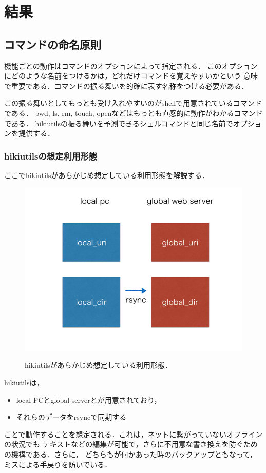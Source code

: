 
\section{結果}
\subsection{コマンドの命名原則}
機能ごとの動作はコマンドのオプションによって指定される．
このオプションにどのような名前をつけるかは，どれだけコマンドを覚えやすいかという
意味で重要である．コマンドの振る舞いを的確に表す名称をつける必要がある．

この振る舞いとしてもっとも受け入れやすいのがshellで用意されているコマンドである．
pwd, ls, rm, touch, openなどはもっとも直感的に動作がわかるコマンドである．
hikiutilsの振る舞いを予測できるシェルコマンドと同じ名前でオプションを提供する．

\subsubsection{hikiutilsの想定利用形態}
ここでhikiutilsがあらかじめ想定している利用形態を解説する．

\begin{figure}[htbp]\begin{center}
\includegraphics[width=12cm,bb= 0 0 937 753]{../figs/./hikiutils_yamane.002.jpg}
\caption{hikiutilsがあらかじめ想定している利用形態．}
\label{fig:002}
\label{default}\end{center}\end{figure}
hikiutilsは，

\begin{itemize}
\item local PCとglobal serverとが用意されており，
\item それらのデータをrsyncで同期する
\end{itemize}
ことで動作することを想定される．これは，ネットに繋がっていないオフラインの状況でも
テキストなどの編集が可能で，さらに不用意な書き換えを防ぐための機構である．さらに，
どちらもが何かあった時のバックアップともなって，ミスによる手戻りを防いでいる．

